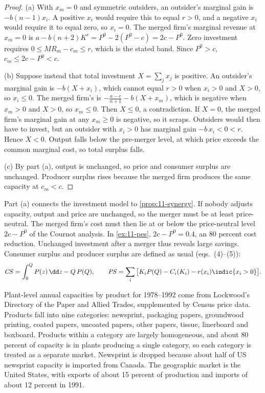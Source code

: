\begin{proof}
(a) With $x_m = 0$ and symmetric outsiders, an outsider's marginal gain is $-b(n - 1)x_i$. A positive $x_i$ would
require this to equal $r > 0$, and a negative $x_i$ would require it to equal zero, so $x_i = 0$. The merged firm's
marginal revenue at $x_m = 0$ is $a - b(n + 2)K^c = P^0 - 2(P^0 - c) = 2c - P^0$. Zero investment requires $0 \le
\mathit{MR}_m - c_m \le r$, which is the stated band. Since $P^0 > c$, $c_m \le 2c - P^0 < c$.

(b) Suppose instead that total investment $X = \sum_j x_j$ is positive. An outsider's marginal gain is $-b(X + x_i)$,
which cannot equal $r > 0$ when $x_i > 0$ and $X > 0$, so $x_i \le 0$. The merged firm's is $-\frac{a - c}{n + 1} -
b(X + x_m)$, which is negative when $x_m > 0$ and $X > 0$, so $x_m \le 0$. Then $X \le 0$, a contradiction. If $X = 0$,
the merged firm's marginal gain at any $x_m \ge 0$ is negative, so it scraps. Outsiders would then have to invest, but
an outsider with $x_i > 0$ has marginal gain $-b\,x_i < 0 < r$. Hence $X < 0$. Output falls below the pre-merger level, at which price exceeds the common marginal cost,
so total surplus falls.

(c) By part (a), output is unchanged, so price and consumer surplus are unchanged. Producer surplus rises because the
merged firm produces the same capacity at $c_m < c$.
\end{proof}

Part (a) connects the investment model to \cref{prop:11-synergy}. If nobody adjusts capacity, output and price are
unchanged, so the merger must be at least price-neutral. The merged firm's cost must then lie at or below the
price-neutral level $2c - P^0$ of the Cournot analysis. In \cref{ex:11-pes}, $2c - P^0 = 0.4$, an 80 percent cost
reduction. Unchanged investment after a merger thus reveals large savings. Consumer surplus and producer surplus
are defined as usual (eqs.~(4)--(5)):
\begin{equation}\label{eq:11-pes-welfare}
\mathit{CS} = \int_0^Q P(z)\,\dd z - Q\,P(Q), \qquad
\mathit{PS} = \sum_i\big[K_iP(Q) - C_i(K_i) - r(x_i)\indic\{x_i > 0\}\big].
\end{equation}

Plant-level annual capacities by product for 1978--1992 come from Lockwood's Directory of the Paper and Allied Trades,
supplemented by Census price data. Products fall into nine categories: newsprint, packaging papers, groundwood printing,
coated papers, uncoated papers, other papers, tissue, linerboard and boxboard. Products within a category are largely
homogeneous, and about 80 percent of capacity is in plants producing a single category, so each category is treated as
a separate market. Newsprint is dropped because about half of US newsprint capacity is imported from Canada. The
geographic market is the United States, with exports of about 15 percent of production and imports of about 12 percent
in 1991.

